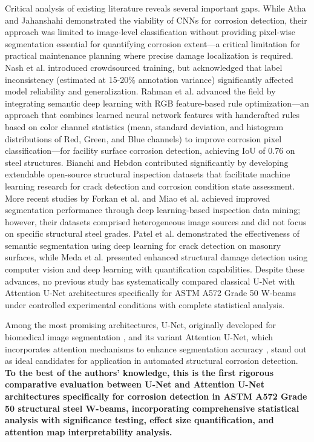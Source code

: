 \documentclass[Journal,letterpaper]{ascelike-new}
\begin{document}
Critical analysis of existing literature reveals several important gaps. While Atha and Jahanshahi \cite{atha2018evaluation} demonstrated the viability of CNNs for corrosion detection, their approach was limited to image-level classification without providing pixel-wise segmentation essential for quantifying corrosion extent---a critical limitation for practical maintenance planning where precise damage localization is required. Nash et al. \cite{nash2018automated} introduced crowdsourced training, but acknowledged that label inconsistency (estimated at 15-20\% annotation variance) significantly affected model reliability and generalization. Rahman et al. \cite{rahman2021semantic} advanced the field by integrating semantic deep learning with RGB feature-based rule optimization---an approach that combines learned neural network features with handcrafted rules based on color channel statistics (mean, standard deviation, and histogram distributions of Red, Green, and Blue channels) to improve corrosion pixel classification---for facility surface corrosion detection, achieving IoU of 0.76 on steel structures. Bianchi and Hebdon \cite{bianchi2022extendable} contributed significantly by developing extendable open-source structural inspection datasets that facilitate machine learning research for crack detection and corrosion condition state assessment. More recent studies by Forkan et al. \cite{forkan2022corodnet} and Miao et al. \cite{miao2023deep} achieved improved segmentation performance through deep learning-based inspection data mining; however, their datasets comprised heterogeneous image sources and did not focus on specific structural steel grades. Patel et al. \cite{patel2024semantic} demonstrated the effectiveness of semantic segmentation using deep learning for crack detection on masonry surfaces, while Meda et al. \cite{meda2025enhanced} presented enhanced structural damage detection using computer vision and deep learning with quantification capabilities. Despite these advances, no previous study has systematically compared classical U-Net with Attention U-Net architectures specifically for ASTM A572 Grade 50 W-beams under controlled experimental conditions with complete statistical analysis.

Among the most promising architectures, U-Net, originally developed for biomedical image segmentation \cite{ronneberger2015u}, and its variant Attention U-Net, which incorporates attention mechanisms to enhance segmentation accuracy \cite{oktay2018attention}, stand out as ideal candidates for application in automated structural corrosion detection. \textbf{To the best of the authors' knowledge, this is the first rigorous comparative evaluation between U-Net and Attention U-Net architectures specifically for corrosion detection in ASTM A572 Grade 50 structural steel W-beams, incorporating comprehensive statistical analysis with significance testing, effect size quantification, and attention map interpretability analysis.}
\end{document}
